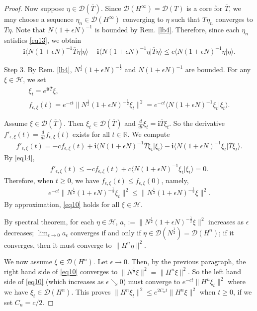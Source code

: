 \documentclass[12pt,a4paper,notitlepage]{article}
\theoremstyle{definition}
\theoremstyle{plain}
\newcommand{\mc}{\mathcal}
\newcommand{\ovl}{\overline}
\newcommand{\Dom}{\scr D}
\newcommand{\bk}[1]{\langle {#1}\rangle}
\newcommand{\scr}{\mathscr}
\newcommand{\im}{\mathbf{i}}
\newcommand{\Rbb}{\mathbb R}
\numberwithin{equation}{subsection}
\begin{document}
\begin{proof}
Now suppose $\eta\in\Dom(\ovl T)$. Since $\Dom(H^\infty)=\Dom(T)$ is a core for $\ovl T$, we may choose a sequence $\eta_n\in\Dom(H^\infty)$ converging to $\eta$ such that $T\eta_n$ converges to $T\eta$. Note that $N(1+\epsilon N)^{-1}$ is bounded by Rem. \ref{lb4}. Therefore, since each $\eta_n$ satisfies \eqref{eq13}, we obtain
\begin{align}
\im\bk{N(1+\epsilon N)^{-1}\ovl T\eta|\eta}-\im\bk{N(1+\epsilon N)^{-1}\eta|\ovl T\eta}	\leq 	c\bk{N(1+\epsilon N)^{-1}\eta|\eta}\label{eq14}.
\end{align}


Step 3. By Rem. \ref{lb4}, $N^{\frac 12}(1+\epsilon N)^{-\frac 12}$ and $N(1+\epsilon N)^{-1}$ are  bounded. For any $\xi\in\mc H$, we set
\begin{gather*}
\xi_t=e^{\im t\ovl T}\xi,\\
f_{\epsilon,\xi}(t)=	e^{-ct}\big\lVert{N^{\frac 12}(1+\epsilon N)^{-\frac 12}\xi_t}\big\lVert^2=e^{-ct}\bk{N(1+\epsilon N)^{-1}\xi_t|\xi_t}.
\end{gather*}


Assume $\xi\in\Dom(\ovl T)$. Then $\xi_t\in\Dom(\ovl T)$ and $\frac d{dt}\xi_t=\im\ovl T\xi_t$. So the derivative $f'_{\epsilon,\xi}(t)=\frac d{dt}f_{\epsilon,\xi}(t)$ exists for all $t\in\Rbb$.  We compute
\begin{align}
f'_{\epsilon,\xi}(t)=-cf_{\epsilon,\xi}(t)+\im\bk{N(1+\epsilon N)^{-1}\ovl T\xi_t|\xi_t}-\im\bk{N(1+\epsilon N)^{-1}\xi_t|\ovl T\xi_t}.\label{eq9}
\end{align}
By \eqref{eq14},
\begin{align*}
f'_{\epsilon,\xi}(t)\leq-cf_{\epsilon,\xi}(t)+c\bk{N(1+\epsilon N)^{-1}\xi_t|\xi_t}=0.
\end{align*}
Therefore, when $t\geq 0$, we have $f_{\epsilon,\xi}(t)\leq f_{\epsilon,\xi}(0)$, namely,
\begin{align}
e^{-ct}\lVert{N^{\frac 12}(1+\epsilon N)^{-\frac 12}\xi_t}\big\lVert^2\leq \lVert{N^{\frac 12}(1+\epsilon N)^{-\frac 12}\xi}\big\lVert^2.\label{eq10}
\end{align}
By approximation, \eqref{eq10} holds for all $\xi\in\mc H$.

By spectral theorem, for each $\eta\in\mc H$, $a_\epsilon:=\lVert{N^{\frac 12}(1+\epsilon N)^{-\frac 12}\xi}\big\lVert^2$ increases as $\epsilon$ decreases; $\lim_{\epsilon\rightarrow 0}a_\epsilon$ converges if and only if $\eta\in\Dom(N^{\frac 12})=\Dom(H^n)$; if it converges, then it must converge to $\lVert H^n\eta\lVert^2$.

We now assume $\xi\in\Dom(H^n)$.  Let $\epsilon\rightarrow 0$. Then, by the previous paragraph, the right hand side of \eqref{eq10} converges to $\lVert N^{\frac 12}\xi\lVert^2=\lVert H^n\xi\lVert^2$. So the left hand side of \eqref{eq10} (which increases as $\epsilon\searrow 0$) must converge to $e^{-ct}\lVert H^n\xi_t\lVert^2$ where we have $\xi_t\in\Dom(H^n)$. This proves $\lVert H^n\xi_t\lVert^2\leq e^{2C_nt}\lVert H^n\xi\lVert^2$ when $t\geq 0$, if we set $C_n=c/2$.
\end{proof}
\end{document}
